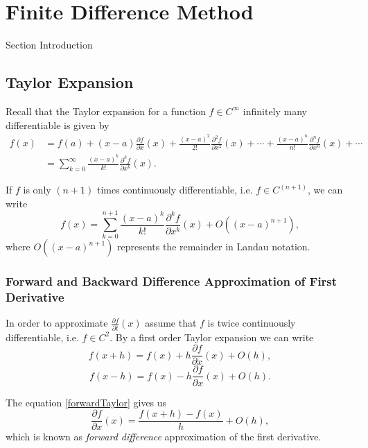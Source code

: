 \chapter{Finite Difference Method}
\label{sec:FD}


Section Introduction

\section{Taylor Expansion}
\label{sec:FD:Taylor}
Recall that the Taylor expansion for a function $f\in C^\infty$ infinitely many differentiable is given by
\begin{align*}
f(x) &= f(a) + (x-a)\frac{\partial f}{\partial x}(x) + \frac{(x-a)^2}{2!}\frac{\partial^2 f}{\partial x^2}(x) + \cdots + \frac{(x-a)^n}{n!}\frac{\partial^n f}{\partial x^n}(x)+\cdots\\
&=\sum_{k = 0}^\infty \frac{(x-a)^k}{k!}\frac{\partial^k f}{\partial x^k}(x).
\end{align*}

If $f$ is only $(n+1)$ times continuously differentiable, i.e. $f\in C^{(n+1)}$, we can write
$$f(x)=\sum_{k = 0}^{n+1} \frac{(x-a)^k}{k!}\frac{\partial^k f}{\partial x^k}(x)+O((x-a)^{n+1}),$$
where $O((x-a)^{n+1})$ represents the remainder in Landau notation.

\subsection{Forward and Backward Difference Approximation of First Derivative}
In order to approximate $\frac{\partial f}{\partial t}(x)$ assume that $f$ is twice continuously differentiable, i.e. $f\in C^2$.  By a first order Taylor expansion we can write
\begin{equation}\label{forwardTaylor}
f(x + h) =  f(x) + h \frac{\partial f}{\partial x}(x)+ O(h),
\end{equation}
\begin{equation}\label{backwardTaylor}
f(x - h) =  f(x) -h \frac{\partial f}{\partial x}(x)+ O(h).
\end{equation}

The equation \eqref{forwardTaylor} gives us
\begin{equation}\label{fwd}
\frac{\partial f}{\partial x}(x) =  \frac{f(x+h)-f(x)}{h} + O(h),
\end{equation}
which is known as \textit{forward difference} approximation of the first derivative. 

